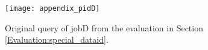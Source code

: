 \documentclass[draft,final]{vutinfth} %
\begin{document}
\begin{figure}[h]
	\centering
	\texttt{[image: appendix\_pidD]}
	\caption{Original query of jobD from the evaluation in Section \ref{Evaluation:special_dataid}.}
	\label{fig:appendix_pidD} %
\end{figure}

\backmatter


\listoffigures %

\cleardoublepage %
\listoftables %



\listoflistings




\printindex

\printglossaries



\end{document}
